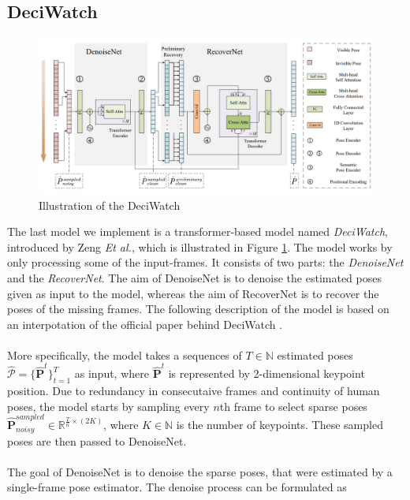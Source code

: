 \documentclass[./main.tex]{subfiles}
\begin{document}
\subsection{DeciWatch}
\begin{figure}[htbp]
    \centering
    \includegraphics[width=\textwidth]{./entities/deciwatch.PNG}
    \caption{Illustration of the DeciWatch \cite{https://doi.org/10.48550/arxiv.2203.08713}}
    \label{fig:deciwatch}
\end{figure}
\noindent The last model we implement is a transformer-based model named \textit{DeciWatch}, introduced by Zeng \textit{Et al.}, which is illustrated in Figure \ref{fig:deciwatch}. The model works by only processing some of the input-frames. It consists of two parts: the \textit{DenoiseNet} and the \textit{RecoverNet}. The aim of DenoiseNet is to denoise the estimated poses given as input to the model, whereas the aim of RecoverNet is to recover the poses of the missing frames. The following description of the model is based on an interpotation of the official paper behind DeciWatch \cite{https://doi.org/10.48550/arxiv.2203.08713}.
\\
\\
More specifically, the model takes a sequences of $T \in \mathbb{N}$ estimated poses $\hat{\mathcal{P}} = \{\hat{\bm{P}}^t\}_{t = 1} ^T$ as input, where $\hat{\bm{P}}^t$ is represented by 2-dimensional keypoint position. Due to redundancy in consecutaive frames and continuity of human poses, the model starts by sampling every $n$th frame to select sparse poses $\hat{\bm{P}}^{sampled} _{noisy} \in \mathbb{R}^{\frac{T}{n} \times (2K)}$, where $K \in \mathbb{N}$ is the number of keypoints. These sampled poses are then passed to DenoiseNet.
\\
\\
The goal of DenoiseNet is to denoise the sparse poses, that were estimated by a single-frame pose estimator. The denoise process can be formulated as
\end{document}

